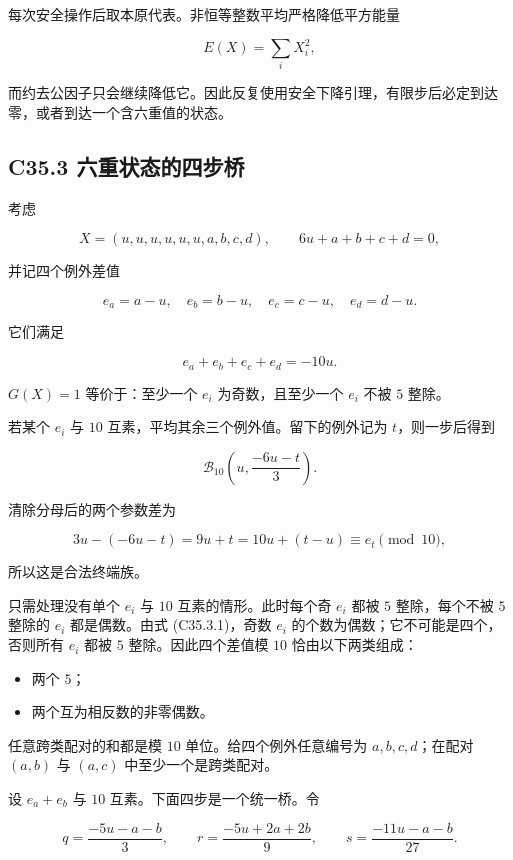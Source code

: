 \documentclass[11pt,a4paper]{article}
\newcommand{\tightlist}{\setlength{\itemsep}{0pt}\setlength{\parskip}{0pt}}
\theoremstyle{definition}
\numberwithin{equation}{section}
\begin{document}
{每次安全操作后取本原代表。非恒等整数平均严格降低平方能量}

\[
E(X)=\sum_iX_i^2,
\]

{而约去公因子只会继续降低它。因此反复使用安全下降引理，有限步后必定到达零，或者到达一个含六重值的状态。}

\subsection*{\texorpdfstring{{C35.3} {六重状态的四步桥}}{C35.3 六重状态的四步桥}}\label{C35-h235}

{考虑}

\[
X=(u,u,u,u,u,u,a,b,c,d),\qquad 6u+a+b+c+d=0,
\]

{并记四个例外差值}

\[
e_a=a-u,\quad e_b=b-u,\quad e_c=c-u,\quad e_d=d-u.
\]

{它们满足}

\[
e_a+e_b+e_c+e_d=-10u.
\tag{C35.3.1}
\]

\(G(X)=1\) {等价于：至少一个} \(e_i\) {为奇数，且至少一个} \(e_i\) {不被} \(5\) {整除。}

{若某个} \(e_i\) {与} \(10\) {互素，平均其余三个例外值。留下的例外记为} \(t\){，则一步后得到}

\[
\mathcal B_{10}\left(u,\frac{-6u-t}{3}\right).
\]

{清除分母后的两个参数差为}

\[
3u-(-6u-t)=9u+t=10u+(t-u)\equiv e_t\pmod{10},
\]

{所以这是合法终端族。}

{只需处理没有单个} \(e_i\) {与} \(10\) {互素的情形。此时每个奇} \(e_i\) {都被} \(5\) {整除，每个不被} \(5\) {整除的} \(e_i\) {都是偶数。由式} {(C35.3.1)，奇数} \(e_i\) {的个数为偶数；它不可能是四个，否则所有} \(e_i\) {都被} \(5\) {整除。因此四个差值模} \(10\) {恰由以下两类组成：}

\begin{itemize}
\tightlist
\item
  {两个} \(5\){；}
\item
  {两个互为相反数的非零偶数。}
\end{itemize}

{任意跨类配对的和都是模} \(10\) {单位。给四个例外任意编号为} \(a,b,c,d\){；在配对} \((a,b)\) {与} \((a,c)\) {中至少一个是跨类配对。}

{设} \(e_a+e_b\) {与} \(10\) {互素。下面四步是一个统一桥。令}

\[
q=\frac{-5u-a-b}{3},\qquad
r=\frac{-5u+2a+2b}{9},\qquad
s=\frac{-11u-a-b}{27}.
\]
\end{document}
